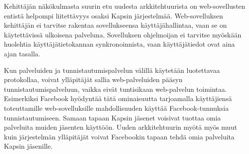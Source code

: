 Kehittäjän näkökulmasta suurin etu uudesta arkkitehtuurista on web-sovellusten entistä helpompi liitettävyys osaksi Kapsin järjestelmää. Web-sovelluksen kehittäjän ei tarvitse rakentaa sovellukseensa käyttäjähallintaa, vaan se on käytettävissä ulkoisena palveluna. Sovelluksen ohjelmoijan ei tarvitse myöskään huolehtia käyttäjätietokannan synkronoinnista, vaan käyttäjätiedot ovat aina ajan tasalla.

Kun palveluiden ja tunnistautumispalvelun välillä käytetään luotettavaa protokollaa, voivat ylläpitäjät sallia web-palveluiden pääsyn tunnistautumispalveluun, vaikka eivät tuntisikaan web-palvelun toimintaa. Esimerkiksi Facebook hyödyntää tätä ominaisuutta tarjoamalla käyttäjiensä toteuttamille web-sovelluksille mahdollisuuden käyttää Facebook-tunnuksia tunnistautumiseen. Samaan tapaan Kapsin jäsenet voisivat tuottaa omia palveluita muiden jäsenten käyttöön. Uuden arkkitehtuurin myötä myös muut kuin järjestelmän ylläpitäjät voivat Facebookin tapaan tehdä omia palveluita Kapsin jäsenille.